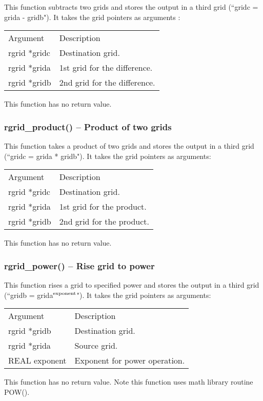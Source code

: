 \documentclass[12pt,letterpaper]{article}
\begin{document}
This function subtracts two grids and stores the output in a third grid (``gridc = grida - gridb"). It takes the grid pointers as arguments :
\begin{longtable}{p{} p{}}
Argument & Description\\
\cline{1-2}
rgrid *gridc & Destination grid.\\
rgrid *grida & 1st grid for the difference.\\
rgrid *gridb & 2nd grid for the difference.\\
\end{longtable}
\noindent
This function has no return value.

\subsubsection{rgrid\_product() -- Product of two grids}

This function takes a product of two grids and stores the output in a third grid (``gridc = grida * gridb"). It takes the grid pointers as arguments:
\begin{longtable}{p{} p{}}
Argument & Description\\
\cline{1-2}
rgrid *gridc & Destination grid.\\
rgrid *grida & 1st grid for the product.\\
rgrid *gridb & 2nd grid for the product.\\
\end{longtable}
\noindent
This function has no return value.

\subsubsection{rgrid\_power() -- Rise grid to power}

This function rises a grid to specified power and stores the output in a third grid (``gridb = grida$^\textnormal{exponent}$"). It takes the grid pointers as arguments:
\begin{longtable}{p{} p{}}
Argument & Description\\
\cline{1-2}
rgrid *gridb & Destination grid.\\
rgrid *grida & Source grid.\\
REAL exponent & Exponent for power operation.\\
\end{longtable}
\noindent
This function has no return value. Note this function uses math library routine POW().
\end{document}
